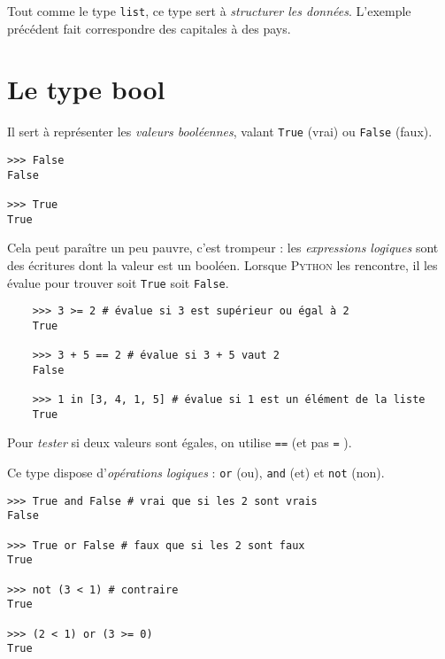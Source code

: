 Tout comme le type \texttt{list}, ce type sert à \textit{structurer les données}. L'exemple précédent fait correspondre des capitales à des pays.



\section{Le type bool}
Il sert à représenter les \textit{valeurs booléennes}, valant \texttt{True} (vrai) ou
\texttt{False} (faux).

\begin{pyc}\begin{verbatim}
>>> False
False

>>> True
True
\end{verbatim}
\end{pyc}

Cela peut paraître un peu pauvre, c'est trompeur : les \textit{expressions logiques} sont des écritures dont la valeur est un booléen. Lorsque \textsc{Python} les rencontre, il les évalue pour trouver soit \texttt{True} soit \texttt{False}.

\begin{pyc}
  \begin{verbatim}
    >>> 3 >= 2 # évalue si 3 est supérieur ou égal à 2
    True
    
    >>> 3 + 5 == 2 # évalue si 3 + 5 vaut 2
    False

    >>> 1 in [3, 4, 1, 5] # évalue si 1 est un élément de la liste
    True
  \end{verbatim}
\end{pyc}

\begin{remarque}[]
  Pour \textit{tester} si deux valeurs sont égales, on utilise \texttt{==}  (et pas \texttt{=} ).
\end{remarque}

Ce type dispose d'\textit{opérations logiques} : \texttt{or} (ou), \texttt{and} (et) et \texttt{not} (non).

\begin{pyc}\begin{verbatim}
>>> True and False # vrai que si les 2 sont vrais
False

>>> True or False # faux que si les 2 sont faux
True

>>> not (3 < 1) # contraire
True

>>> (2 < 1) or (3 >= 0)
True
\end{verbatim}
\end{pyc}